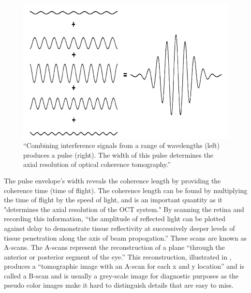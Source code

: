 \begin{figure}[htbp]
\centering
 \includegraphics{figures/morgan_2}
\caption{“Combining interference signals from a range of wavelengths (left) produces a pulse (right). The width of this pulse determines the axial resolution of optical coherence tomography.” \cite{mbib_6} }
\label{fig:m_2}
\end{figure}

The pulse envelope’s width reveals the coherence length by providing
the coherence time (time of flight).  The coherence length can be found
by multiplying the time of flight by the speed of light, and is an
important quantity as it "determines the axial resolution of the OCT
system." \cite{mbib_6}  By scanning the retina and recording this
information, “the amplitude of reflected light can be plotted against
delay to demonstrate tissue reflectivity at successively deeper levels
of tissue penetration along the axis of beam propogation.” \cite{mbib_6}
These scans are known as A-scans.  The A-scans represent the reconstruction
of a plane “through the anterior or posterior segment of the eye.”\cite{mbib_6}
This reconstruction, illustrated in , produces a “tomographic
image with an A-scan for each x and y location” and is called a B-scan and is
usually a grey-scale image for diagnostic purposes as the pseudo color images
make it hard to distinguish details that are easy to miss. \cite{mbib_5,mbib_4,mbib_7} 

